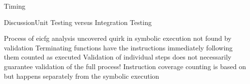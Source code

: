 \begin{frame}[label=timing]{ Timing}
  \centering
  \hyperlink{hg-results}{}
\end{frame}

\begin{frame}{Discussion}{Unit Testing versus Integration Testing}
  \begin{outline}
      \1 Process of \gls{eicfg} analysis uncovered quirk in symbolic execution \alert{not} found by validation
        \2 Terminating functions have the instructions immediately following them counted as executed
      \1 Validation of individual steps does not necessarily guarantee validation of the full process!
        \2 Instruction coverage counting is based on but happens separately from the symbolic execution
    \end{outline}
\end{frame}

\begin{comment}
      \1 Not all arbitrary concrete states constructible
  \2 Cannot do fully arbitrary memory manipulation without additional memory allocation/deallocation; affects
  \3 Exception type info
  \3 Linked list $\caught$ of caught exceptions
  \1 \inlineasm{_Unwind_Resume} does not direct control flow to expected landing pad
  \2 Prevented validation of correct output \gls{ip} (\rip)
\end{comment}
